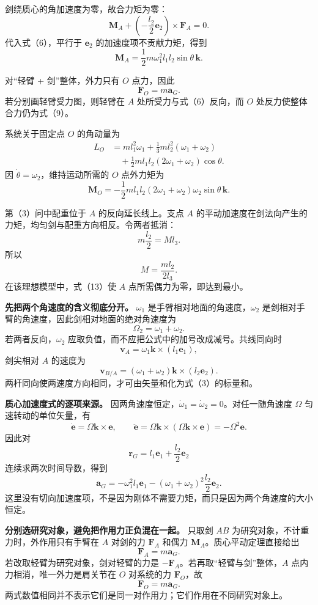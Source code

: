 \documentclass[12pt,a4paper,UTF8]{ctexart}
\begin{document}
剑绕质心的角加速度为零，故合力矩为零： \[
\boldsymbol M_A+
\left(-\frac{l_2}{2}\boldsymbol e_2\right)
\times\boldsymbol F_A=0. \tag{7}
\] 代入式（6），平行于 \(\boldsymbol e_2\) 的加速度项不贡献力矩，得到 \[
\boxed{
\boldsymbol M_A
=\frac12m\omega_1^2l_1l_2\sin\theta\,\boldsymbol k
}. \tag{8}
\]

对``轻臂 + 剑''整体，外力只有 \(O\) 点力，因此 \[
\boxed{\boldsymbol F_O=m\boldsymbol a_G}. \tag{9}
\] 若分别画轻臂受力图，则轻臂在 \(A\) 处所受力与式（6）反向，而 \(O\)
处反力使整体合力仍为式（9）。

系统关于固定点 \(O\) 的角动量为 \[
\begin{aligned}
L_O
&=m l_1^2\omega_1
+\frac13m l_2^2(\omega_1+\omega_2)\\
&\quad+\frac12m l_1l_2(2\omega_1+\omega_2)\cos\theta.
\end{aligned} \tag{10}
\] 因 \(\dot\theta=\omega_2\)，维持运动所需的 \(O\) 点外力矩为 \[
\boxed{
\boldsymbol M_O
=-\frac12m l_1l_2(2\omega_1+\omega_2)
\omega_2\sin\theta\,\boldsymbol k
}. \tag{11}
\]

第（3）问中配重位于 \(A\) 的反向延长线上。支点 \(A\)
的平动加速度在剑法向产生的力矩，均匀剑与配重方向相反。令两者抵消： \[
m\frac{l_2}{2}=Ml_3. \tag{12}
\] 所以 \[
\boxed{M=\frac{ml_2}{2l_3}}. \tag{13}
\] 在该理想模型中，式（13）使 \(A\) 点所需偶力为零，即达到最小。

\textbf{先把两个角速度的含义彻底分开。} \(\omega_1\)
是手臂相对地面的角速度，\(\omega_2\)
是剑相对手臂的角速度，因此剑相对地面的绝对角速度为 \[
\Omega_2=\omega_1+\omega_2.
\] 若两者反向，\(\omega_2\)
应取负值，而不应把公式中的加号改成减号。共线同向时 \[
\boldsymbol v_A=\omega_1\boldsymbol k\times(l_1\boldsymbol e_1),
\] 剑尖相对 \(A\) 的速度为 \[
\boldsymbol v_{B/A}=(\omega_1+\omega_2)
\boldsymbol k\times(l_2\boldsymbol e_2).
\] 两杆同向使两速度方向相同，才可由矢量和化为式（3）的标量和。

\textbf{质心加速度式的逐项来源。}
因两角速度恒定，\(\dot\omega_1=\dot\omega_2=0\)。对任一随角速度
\(\Omega\) 匀速转动的单位矢量，有 \[
\dot{\boldsymbol e}=\Omega\boldsymbol k\times\boldsymbol e,
\qquad
\ddot{\boldsymbol e}
=\Omega\boldsymbol k\times
(\Omega\boldsymbol k\times\boldsymbol e)
=-\Omega^2\boldsymbol e.
\] 因此对 \[
\boldsymbol r_G=l_1\boldsymbol e_1+\frac{l_2}{2}\boldsymbol e_2
\] 连续求两次时间导数，得到 \[
\boldsymbol a_G
=-\omega_1^2l_1\boldsymbol e_1
-(\omega_1+\omega_2)^2\frac{l_2}{2}\boldsymbol e_2.
\]
这里没有切向加速度项，不是因为刚体不需要力矩，而只是因为两个角速度的大小恒定。

\textbf{分别选研究对象，避免把作用力正负混在一起。} 只取剑 \(AB\)
为研究对象，不计重力时，外作用只有手臂在 \(A\) 对剑的力
\(\boldsymbol F_A\) 和偶力 \(\boldsymbol M_A\)。质心平动定理直接给出 \[
\boldsymbol F_A=m\boldsymbol a_G.
\] 若改取轻臂为研究对象，剑对轻臂的力是
\(-\boldsymbol F_A\)。若再取``轻臂与剑''整体，\(A\)
点内力相消，唯一外力是肩关节在 \(O\) 对系统的力 \(\boldsymbol F_O\)，故
\[
\boldsymbol F_O=m\boldsymbol a_G.
\] 两式数值相同并不表示它们是同一对作用力；它们作用在不同研究对象上。
\end{document}
